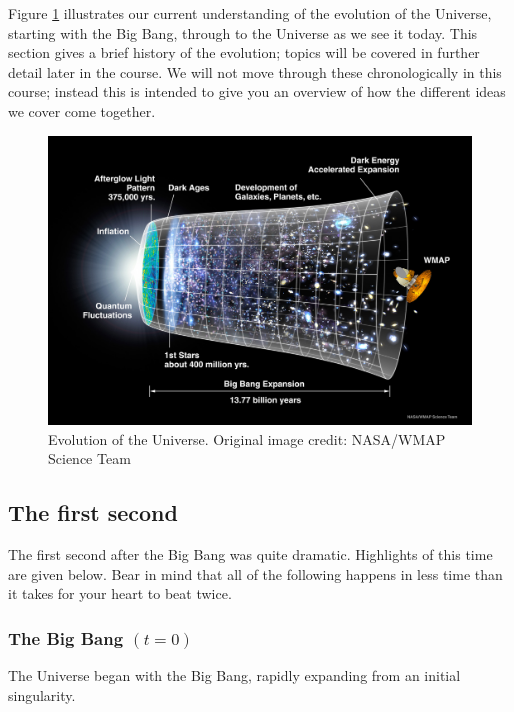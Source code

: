 \documentclass[]{book}
\begin{document}
Figure \ref{fig:evo-universe} illustrates our current understanding of
the evolution of the Universe, starting with the Big Bang, through to
the Universe as we see it today. This section gives a brief history of
the evolution; topics will be covered in further detail later in the
course. We will not move through these chronologically in this course;
instead this is intended to give you an overview of how the different
ideas we cover come together.

\begin{figure}
\includegraphics[width=1\linewidth]{Images/060915_CMB_Timeline150_annotated} \caption{Evolution of the Universe. Original image credit: NASA/WMAP Science Team}\label{fig:evo-universe}
\end{figure}

\subsection{The first second}\label{sec:first_second}

The first second after the Big Bang was quite dramatic. Highlights of
this time are given below. Bear in mind that all of the following
happens in less time than it takes for your heart to beat twice.

\subsubsection*{\texorpdfstring{The Big Bang
\((t = 0)\)}{The Big Bang (t = 0)}}\label{the-big-bang-t-0}

The Universe began with the Big Bang, rapidly expanding from an initial
singularity.
\end{document}
